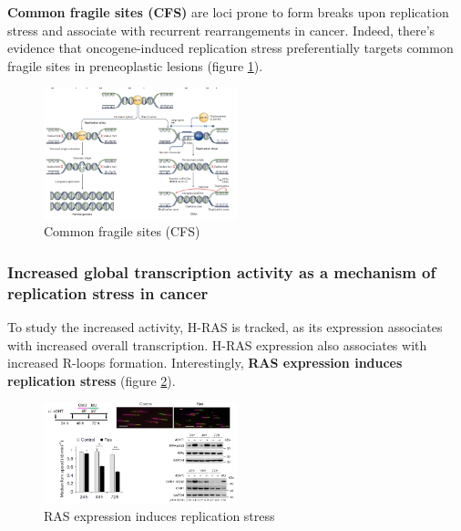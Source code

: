 	
\textbf{Common fragile sites (CFS)} are loci prone to form breaks upon
replication stress and associate with recurrent rearrangements in
cancer. Indeed, there's evidence that oncogene-induced replication
stress preferentially targets common fragile sites in preneoplastic
lesions (figure \ref{fig:CFS}).

\begin{figure}
\centering
\includegraphics[width=0.5\textwidth]{../_resources/c0296c07042a0397b2b5c43d74b2f158.png}
\caption{Common fragile sites (CFS)}
\label{fig:CFS}
\end{figure}

\hypertarget{increased-global-transcription-activity-as-a-mechanism-of-replication-stress-in-cancer}{%
\subsubsection{Increased global transcription activity as a mechanism of
replication stress in
cancer}\label{increased-global-transcription-activity-as-a-mechanism-of-replication-stress-in-cancer}}

To study the increased activity, H-RAS is tracked, as its expression
associates with increased overall transcription. H-RAS expression also
associates with increased R-loops formation. Interestingly, \textbf{RAS
expression induces replication stress} (figure \ref{fig:RAS}).

\begin{figure}[h!]
\centering
\includegraphics[width=0.5\textwidth]{../_resources/74f971d93ec73bb49f66e1c9f6c16c26.png}
\caption{RAS expression induces replication stress}
\label{fig:RAS}
\end{figure}

